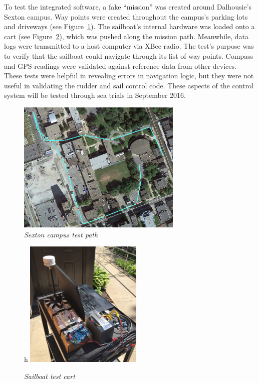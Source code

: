 \documentclass[12pt]{article}
\begin{document}
To test the integrated software, a fake ``mission'' was created around Dalhousie's Sexton campus. Way points were created throughout the campus's parking lots and driveways (see Figure~\ref{fig:sexton_path}). The sailboat's internal hardware was loaded onto a cart (see Figure~\ref{fig:sail_cart}), which was pushed along the mission path. Meanwhile, data logs were transmitted to a host computer via XBee radio. The test's purpose was to verify that the sailboat could navigate through its list of way points. Compass and GPS readings were validated against reference data from other devices. These tests were helpful in revealing errors in navigation logic, but they were not useful in validating the rudder and sail control code. These aspects of the control system will be tested through sea trials in September 2016.

\begin{figure}[h]
	\centering
	\includegraphics[width=0.7\textwidth]{figures/sexton_path.png}
	\caption[Sexton campus test path]{\textsl{Sexton campus test path}}
	\label{fig:sexton_path}
\end{figure}

\begin{figure}{h}
	\centering
	\includegraphics[width=0.5\textwidth]{figures/sailboat_cart1.jpg}
	\caption[Sailboat test cart]{\textsl{Sailboat test cart}}
	\label{fig:sail_cart}
\end{figure}
\end{document}
